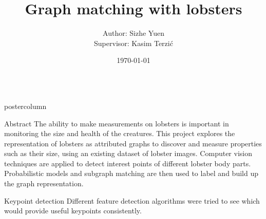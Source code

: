 \documentclass{beamer}
\title{\huge Graph matching with lobsters}
\author{Author: Sizhe Yuen \\[0.5ex] Supervisor: Kasim Terzi\'{c}}
\institute[ETH]{School of Computer Science, University of St Andrews}
\date{\today}
\newlength{\columnheight}
\begin{document}
\begin{frame}
\begin{columns}

\begin{column}{.4\textwidth}
\begin{beamercolorbox}[center]{postercolumn}
\begin{minipage}{.98\textwidth}  %
\parbox[t][\columnheight]{\textwidth}{ %


\begin{myblock}{Abstract}
The ability to make measurements on lobsters is important in monitoring the size and health of the creatures.
This project explores the representation of lobsters as attributed graphs to discover and measure properties such as their size, using an existing dataset of lobster images.
Computer vision techniques are applied to detect interest points of different lobster body parts. 
Probabilistic models and subgraph matching are then used to label and build up the graph representation.
\end{myblock}


\begin{myblock}{Keypoint detection}
Different feature detection algorithms were tried to see which would provide useful keypoints consistently.

\begin{center}


\end{center}
\end{myblock}}
\end{minipage}
\end{beamercolorbox}
\end{column}
\end{columns}
\end{frame}
\end{document}
